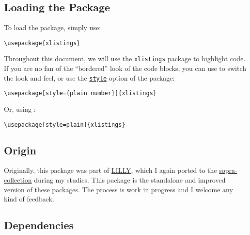 \documentclass[10pt,DIV=12]{scrartcl}
\let\T\texttt
\def\argref#1#2{\hyperref[arg:#1]{\T{#2}}}
\begin{document}
\subsection{Loading the Package}\label{sec:loading-pkg}

To load the package, simply use:

\begin{verbatim}
\usepackage{xlistings}
\end{verbatim}

Throughout this document, we will use the \T{xlistings} package to highlight code.
If you are no fan of the \enquote{bordered} look of the code blocks, you can use  to switch the look and feel, or use the \argref{style}{style} option of the package:

\begin{verbatim}
\usepackage[style={plain number}]{xlistings}
\end{verbatim}

Or, using :

\begin{verbatim}
\usepackage[style=plain]{xlistings}
\end{verbatim}

\subsection{Origin}

Originally, this package was part of \href{https://github.com/EagleoutIce/LILLY}{\MakeUppercase{lilly}}, which I again ported to the \href{https://github.com/EagleoutIce/sopra-collection}{sopra-collection} during my studies. This package is the standalone and improved version of these packages. The process is work in progress and I welcome any kind of feedback.

\subsection{Dependencies}
\end{document}
